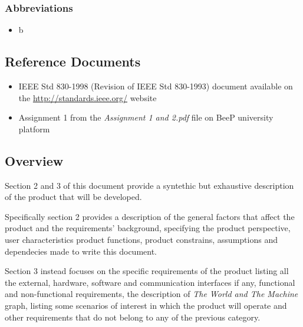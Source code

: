 		\subsubsection{Abbreviations}
		\begin{itemize}
			\item b
		\end{itemize}
	\subsection{Reference Documents}
	\begin{itemize}
		\item IEEE Std 830-1998 (Revision of IEEE Std 830-1993) document available on the \url{http://standards.ieee.org/} website
		\item Assignment 1 from the \emph{Assignment 1 and 2.pdf} file on BeeP university platform
	\end{itemize}
	\subsection{Overview}
		Section 2 and 3 of this document provide a syntethic but exhaustive description of the product that will be developed.
				
		Specifically section 2 provides a description of the general factors that affect the product and the requirements' background, specifying the product perspective, user characteristics product functions, product constrains, assumptions and dependecies made to write this document.
		
		Section 3 instead focuses on the specific requirements of the product listing all the external, hardware, software and communication interfaces if any, functional and non-functional requirements, the description of \emph{The World and The Machine} graph, listing some scenarios of interest in which the product will operate and other requirements that do not belong to any of the previous category. 
	
	